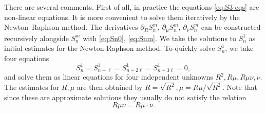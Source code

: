 \documentclass[a4paper,11pt]{article}
\theoremstyle{definition}
\newcommand{\pd}{\partial}
\begin{document}
There are several comments. %
First of all, in practice the equations \eqref{eq:S3-eqs} are non-linear
equations.  It is more convenient to solve them iteratively by the
Newton--Raphson method.  The derivatives $\pd_R S_n^m$,
$\pd_\mu S_n^m$, $\pd_\nu S_n^m$ can be constructed recursively
alongside $S_n^m$ with \eqref{eq:Sn0}, \eqref{eq:Snm}.  We take the
solutions to $S_n^{1}$ as initial estimates for the Newton-Raphson
method.  To quickly solve $S_n^{1}$, we take four equations
\begin{equation}
  S_{n}^{1} = S_{n-\ell}^{1}=
  S_{n-2\ell}^{1} = S_{n-3\ell}^{1} = 0,
\end{equation}
and solve them as linear equations for four independent unknowns
$R^2,R\mu,R\mu\nu, \nu$.  The estimates for $R,\mu$ are then obtained
by $R = \sqrt{R^2}, \mu = R\mu/\sqrt{R^2}$. Note that since these are
approximate solutions they usually do not satisfy the relation
\begin{equation}
  R\mu\nu = R\mu \cdot \nu.
\end{equation}
\end{document}
